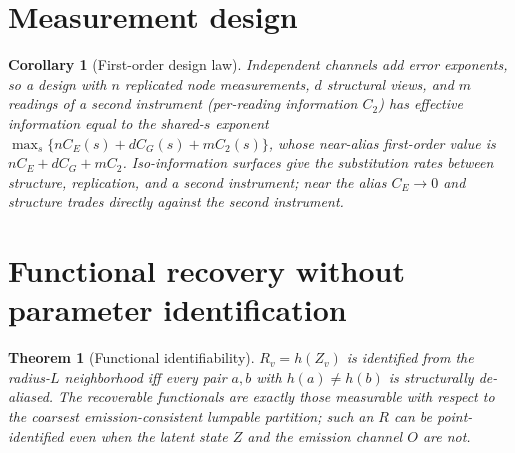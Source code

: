 \documentclass[11pt]{article}
\theoremstyle{plain}
\newtheorem{theorem}{Theorem}\newtheorem{proposition}{Proposition}\newtheorem{corollary}{Corollary}
\theoremstyle{definition}\newtheorem{definition}{Definition}\newtheorem{assumption}{Assumption}
\begin{document}
\section{Measurement design}\label{sec:design}
\begin{corollary}[First-order design law]\label{cor:design}
Independent channels add error exponents, so a design with $n$ replicated node measurements, $d$ structural views,
and $m$ readings of a second instrument (per-reading information $C_2$) has effective information equal to the
shared-$s$ exponent $\max_s\{nC_E(s)+dC_G(s)+mC_2(s)\}$, whose near-alias first-order value is
$nC_E+dC_G+mC_2$. Iso-information surfaces give the substitution rates between structure, replication, and a
second instrument; near the alias $C_E\to0$ and structure trades directly against the second instrument.
\end{corollary}

\section{Functional recovery without parameter identification}\label{sec:func}
\begin{theorem}[Functional identifiability]\label{thm:func}
$R_v=h(Z_v)$ is identified from the radius-$L$ neighborhood iff every pair $a,b$ with $h(a)\neq h(b)$ is
structurally de-aliased. The recoverable functionals are exactly those measurable with respect to the coarsest
emission-consistent lumpable partition; such an $R$ can be point-identified even when the latent state $Z$ and the
emission channel $O$ are not.
\end{theorem}
\end{document}
